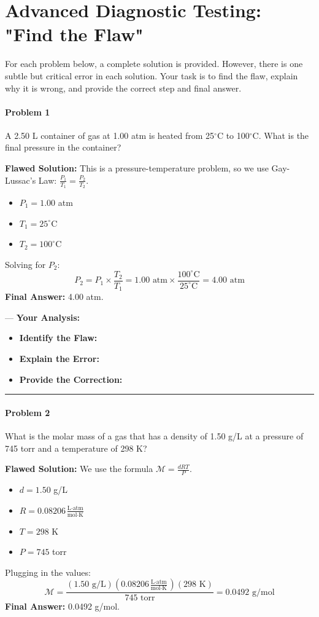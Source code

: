 \documentclass{article}
\begin{document}
\part{Advanced Diagnostic Testing: "Find the Flaw"}
For each problem below, a complete solution is provided. However, there is one subtle but critical error in each solution. Your task is to find the flaw, explain why it is wrong, and provide the correct step and final answer.

\subsection{Problem 1}
A 2.50 L container of gas at 1.00 atm is heated from 25$^{\circ}$C to 100$^{\circ}$C. What is the final pressure in the container?

\textbf{Flawed Solution:}
This is a pressure-temperature problem, so we use Gay-Lussac's Law: $\frac{P_1}{T_1} = \frac{P_2}{T_2}$.
\begin{itemize}
    \item $P_1 = 1.00$ atm
    \item $T_1 = 25^{\circ}$C
    \item $T_2 = 100^{\circ}$C
\end{itemize}
Solving for $P_2$:
\[ P_2 = P_1 \times \frac{T_2}{T_1} = 1.00 \text{ atm} \times \frac{100^{\circ}\text{C}}{25^{\circ}\text{C}} = 4.00 \text{ atm} \]
\textbf{Final Answer:} 4.00 atm.

---
\textbf{Your Analysis:}
\begin{itemize}
    \item \textbf{Identify the Flaw:}
    \item \textbf{Explain the Error:}
    \item \textbf{Provide the Correction:}
\end{itemize}
\rule{\textwidth}{0.4pt}

\subsection{Problem 2}
What is the molar mass of a gas that has a density of 1.50 g/L at a pressure of 745 torr and a temperature of 298 K?

\textbf{Flawed Solution:}
We use the formula $\mathcal{M} = \frac{dRT}{P}$.
\begin{itemize}
    \item $d = 1.50$ g/L
    \item $R = 0.08206 \frac{\text{L} \cdot \text{atm}}{\text{mol} \cdot \text{K}}$
    \item $T = 298$ K
    \item $P = 745$ torr
\end{itemize}
Plugging in the values:
\[ \mathcal{M} = \frac{(1.50 \text{ g/L})(0.08206 \frac{\text{L} \cdot \text{atm}}{\text{mol} \cdot \text{K}})(298 \text{ K})}{745 \text{ torr}} = 0.0492 \text{ g/mol} \]
\textbf{Final Answer:} 0.0492 g/mol.
\end{document}
